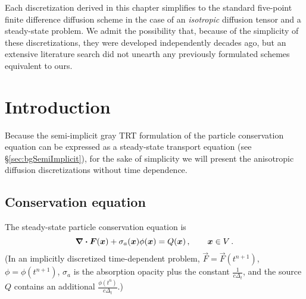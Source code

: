 Each discretization derived in this chapter simplifies to the standard
five-point finite difference diffusion scheme in the case of an
\emph{isotropic} diffusion tensor and a steady-state problem. We admit the
possibility that, because of the simplicity of these discretizations, they were
developed independently decades ago, but an extensive literature search did not
unearth any previously formulated schemes equivalent to ours.

\section{Introduction}

Because the semi-implicit gray TRT formulation of the particle conservation
equation can be expressed as a steady-state transport equation (see
\S\ref{sec:bgSemiImplicit}), for the sake of simplicity we will present the
anisotropic diffusion discretizations without time dependence.

\subsection{Conservation equation}

The steady-state particle conservation equation is
\begin{equation}\label{eq:ssConservation}
  \bm{\nabla} \bm{\cdot} \bm{F}(\bm{x}) + \sigma_a(\bm{x}) \phi(\bm{x}) =
  Q(\bm{x})\,,\qquad \bm{x} \in V\,.
\end{equation}
(In an implicitly discretized time-dependent problem,
$\vec{F}=\vec{F}(t^{n+1})$, $\phi=\phi(t^{n+1})$, $\sigma_a$ is 
the absorption opacity plus the constant $\frac{1}{c\Delta_t}$, and the source
$Q$ contains an additional $\frac{\phi(t^{n})}{c\Delta_t}$.) 

